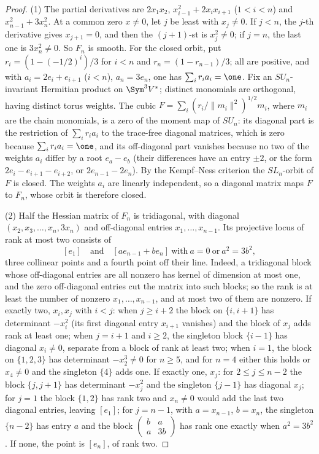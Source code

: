\begin{proof}
(1) The partial derivatives are $2x_1x_2$, $x_{i-1}^2+2x_ix_{i+1}$
($1<i<n$) and $x_{n-1}^2+3x_n^2$. At a common zero $x\ne0$, let $j$ be least
with $x_j\ne0$. If $j<n$, the $j$-th derivative gives $x_{j+1}=0$, and then
the $(j+1)$-st is $x_j^2\ne0$; if $j=n$, the last one is $3x_n^2\ne0$. So
$F_n$ is smooth. For the closed orbit, put $r_i=(1-(-1/2)^i)/3$ for $i<n$ and
$r_n=(1-r_{n-1})/3$; all are positive, and with $a_i=2e_i+e_{i+1}$ ($i<n$),
$a_n=3e_n$, one has $\sum_ir_ia_i=\one$. Fix an $SU_n$-invariant Hermitian
product on $\Sym^3V^*$; distinct monomials are orthogonal, having distinct
torus weights. The cubic $F=\sum_i(r_i/\|m_i\|^2)^{1/2}m_i$, where $m_i$ are the
chain monomials, is a zero of the moment map of $SU_n$: its diagonal part is the restriction of $\sum_ir_ia_i$ to the trace-free
diagonal matrices, which is zero because $\sum_ir_ia_i=\one$, and its off-diagonal part
vanishes because no two of the weights $a_i$ differ by a root $e_a-e_b$
(their differences have an entry $\pm2$, or the form $2e_i-e_{i+1}-e_{i+2}$, or
$2e_{n-1}-2e_n$). By the Kempf--Ness criterion \cite[Theorem 4, p.~1]{Losev}
the $SL_n$-orbit of $F$ is closed. The weights $a_i$ are linearly independent,
so a diagonal matrix maps $F$ to $F_n$, whose orbit is therefore closed.

(2) Half the Hessian matrix of $F_n$ is tridiagonal, with diagonal
$(x_2,x_3,\dots,x_n,3x_n)$ and off-diagonal entries $x_1,\dots,x_{n-1}$. Its
projective locus of rank at most two consists of
\begin{equation}\label{eq:hessianlocus}
 [e_1]\quad\text{and}\quad[ae_{n-1}+be_n]\ \text{with}\ a=0\ \text{or}\ a^2=3b^2 ,
\end{equation}
three collinear points and a fourth point off their line. Indeed, a tridiagonal
block whose off-diagonal entries are all nonzero has kernel of dimension at
most one, and the zero off-diagonal entries cut the matrix into such blocks; so
the rank is at least the number of nonzero $x_1,\dots,x_{n-1}$, and at most two
of them are nonzero. If exactly two, $x_i,x_j$ with $i<j$: when $j\ge i+2$ the
block on $\{i,i+1\}$ has determinant $-x_i^2$ (its first diagonal entry
$x_{i+1}$ vanishes) and the block of $x_j$ adds rank at least one; when $j=i+1$
and $i\ge2$, the singleton block $\{i-1\}$ has diagonal $x_i\ne0$, separate
from a block of rank at least two; when $i=1$, the block on $\{1,2,3\}$ has
determinant $-x_2^3\ne0$ for $n\ge5$, and for $n=4$ either this holds or
$x_4\ne0$ and the singleton $\{4\}$ adds one. If exactly one, $x_j$: for $2\le
j\le n-2$ the block $\{j,j+1\}$ has determinant $-x_j^2$ and the singleton
$\{j-1\}$ has diagonal $x_j$; for $j=1$ the block $\{1,2\}$ has rank two and
$x_n\ne0$ would add the last two diagonal entries, leaving $[e_1]$; for
$j=n-1$, with $a=x_{n-1}$, $b=x_n$, the singleton $\{n-2\}$ has entry $a$ and
the block $\left(\begin{smallmatrix}b&a\\a&3b\end{smallmatrix}\right)$ has rank
one exactly when $a^2=3b^2$. If none, the point is $[e_n]$, of rank two.


\end{proof}
